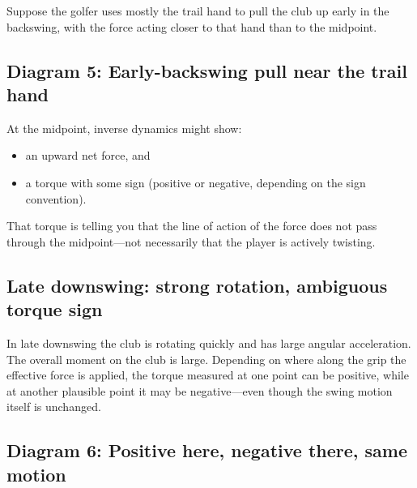\documentclass[12pt]{article}
\begin{document}
Suppose the golfer uses mostly the trail hand to pull the club up early in the backswing, with the force acting closer to that hand than to the midpoint.

\subsection*{Diagram 5: Early-backswing pull near the trail hand}

\begin{center}
\end{center}

At the midpoint, inverse dynamics might show:
\begin{itemize}
    \item an upward net force, and
    \item a torque with some sign (positive or negative, depending on the sign convention).
\end{itemize}

That torque is telling you that the line of action of the force does not pass through the midpoint—not necessarily that the player is actively twisting.

\subsection{Late downswing: strong rotation, ambiguous torque sign}

In late downswing the club is rotating quickly and has large angular acceleration.  
The overall moment on the club is large.  
Depending on where along the grip the effective force is applied, the torque measured at one point can be positive, while at another plausible point it may be negative—even though the swing motion itself is unchanged.

\subsection*{Diagram 6: Positive here, negative there, same motion}
\end{document}
